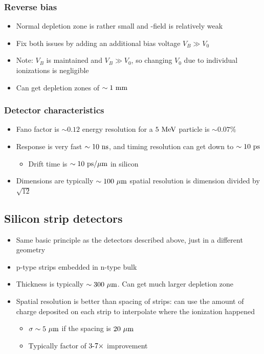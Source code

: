 \subsubsection{Reverse bias}
\begin{itemize}
  \item Normal depletion zone is rather small and \E-field is relatively weak
  \item Fix both issues by adding an additional bias voltage $V_B\gg V_0$
  \item Note: $V_B$ is maintained and $V_B\gg V_0$, so changing $V_0$ due to individual ionizations is negligible
  \item Can get depletion zones of $\sim1~\text{mm}$
\end{itemize}

\subsubsection{Detector characteristics}
\begin{itemize}
  \item Fano factor is $\sim 0.12$ \thus energy resolution for a $5~\text{MeV}$ particle is $\sim 0.07\%$
  \item Response is very fast $\sim 10~\text{ns}$, and timing resolution can get down to $\sim 10~\text{ps}$
  \begin{itemize}
    \item Drift time is $\sim 10~\text{ps}/\mu\text{m}$ in silicon
  \end{itemize}
  \item Dimensions are typically $\sim 100~\mu\text{m}$ \thus spatial resolution is dimension divided by $\sqrt{12}$
\end{itemize}

\subsection{Silicon strip detectors}
\begin{itemize}
  \item Same basic principle as the detectors described above, just in a different geometry
  \item p-type strips embedded in n-type bulk
  \item Thickness is typically $\sim 300~\mu\text{m}$. Can get much larger depletion zone
  \item Spatial resolution is better than spacing of strips: can use the amount of charge deposited on each strip to interpolate where the ionization happened
  \begin{itemize}
    \item \thus $\sigma \sim 5~\mu\text{m}$ if the spacing is $20~\mu\text{m}$
    \item Typically factor of $3\textto7\times$ improvement
  \end{itemize}
\end{itemize}

